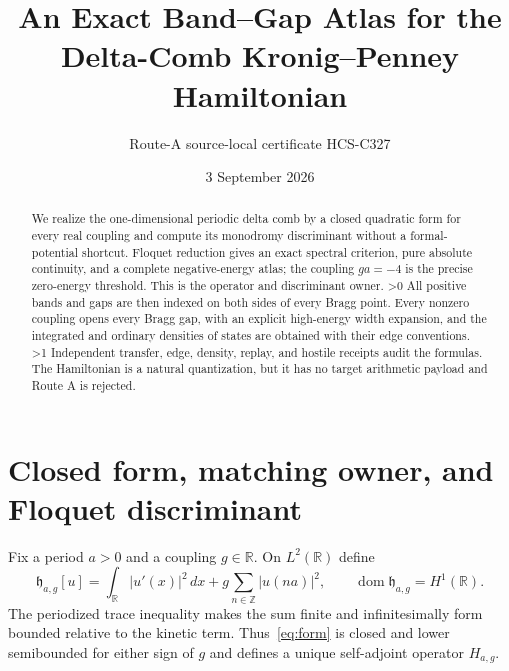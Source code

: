 \documentclass[10pt]{article}
\title{An Exact Band--Gap Atlas for the Delta-Comb Kronig--Penney Hamiltonian}
\author{Route-A source-local certificate HCS-C327}
\date{3 September 2026}
\providecommand{\CRevisionRound}{2}
\newcommand{\R}{\mathbb R}
\begin{document}
\maketitle
\begin{abstract}
We realize the one-dimensional periodic delta comb by a closed quadratic form
for every real coupling and compute its monodromy discriminant without a
formal-potential shortcut.  Floquet reduction gives an exact spectral
criterion, pure absolute continuity, and a complete negative-energy atlas;
the coupling $ga=-4$ is the precise zero-energy threshold.  This is the
operator and discriminant owner.
\ifnum\CRevisionRound>0
All positive bands and gaps are then indexed on both sides of every Bragg
point.  Every nonzero coupling opens every Bragg gap, with an explicit
high-energy width expansion, and the integrated and ordinary densities of
states are obtained with their edge conventions.
\fi
\ifnum\CRevisionRound>1
Independent transfer, edge, density, replay, and hostile receipts audit the
formulas.  The Hamiltonian is a natural quantization, but it has no target
arithmetic payload and Route A is rejected.
\fi
\end{abstract}

\section{Closed form, matching owner, and Floquet discriminant}
Fix a period $a>0$ and a coupling $g\in\R$.  On $L^2(\R)$ define
\begin{equation}\label{eq:form}
 \mathfrak h_{a,g}[u]=\int_{\R}|u'(x)|^2\,dx
       +g\sum_{n\in\mathbb Z}|u(na)|^2,
 \qquad \operatorname{dom}\mathfrak h_{a,g}=H^1(\R).
\end{equation}
The periodized trace inequality makes the sum finite and infinitesimally
form bounded relative to the kinetic term.  Thus~\eqref{eq:form} is closed
and lower semibounded for either sign of $g$ and defines a unique
self-adjoint operator $H_{a,g}$.
\end{document}
